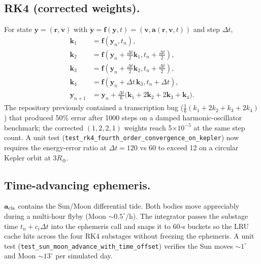 \documentclass[11pt]{amsart}
\begin{document}
\subsection{RK4 (corrected weights).}
For state $\mathbf y=(\mathbf r,\mathbf v)$ with $\dot{\mathbf y}=\mathbf f(\mathbf y,t)
=(\mathbf v,\mathbf a(\mathbf r,\mathbf v,t))$ and step $\Delta t$,
\begin{align*}
\mathbf k_1 &= \mathbf f(\mathbf y_n,t_n),\\
\mathbf k_2 &= \mathbf f(\mathbf y_n+\tfrac{\Delta t}{2}\mathbf k_1, t_n+\tfrac{\Delta t}{2}),\\
\mathbf k_3 &= \mathbf f(\mathbf y_n+\tfrac{\Delta t}{2}\mathbf k_2, t_n+\tfrac{\Delta t}{2}),\\
\mathbf k_4 &= \mathbf f(\mathbf y_n+\Delta t\,\mathbf k_3, t_n+\Delta t),\\
\mathbf y_{n+1} &= \mathbf y_n + \tfrac{\Delta t}{6}\bigl(\mathbf k_1+2\mathbf k_2
  +2\mathbf k_3+\mathbf k_4\bigr).
\end{align*}
The repository previously contained a transcription bug
($\tfrac{1}{6}(k_1+2k_2+k_3+2k_4)$) that produced 50\% error after 1000 steps on a damped
harmonic-oscillator benchmark; the corrected $(1,2,2,1)$ weights reach 5$\times 10^{-5}$ at
the same step count. A unit test (\texttt{test\_rk4\_fourth\_order\_convergence\_on\_kepler})
now requires the energy-error ratio at $\Delta t=120$ vs $60$ to exceed 12 on a circular
Kepler orbit at $3R_\oplus$.

\subsection{Time-advancing ephemeris.}
$\mathbf a_{\rm cls}$ contains the Sun/Moon differential tide. Both bodies move appreciably
during a multi-hour flyby (Moon $\sim 0.5^\circ$/h). The integrator passes the substage time
$t_n+c_i\Delta t$ into the ephemeris call and snaps it to 60-s buckets so the LRU cache hits
across the four RK4 substages without freezing the ephemeris. A unit test
(\texttt{test\_sun\_moon\_advance\_with\_time\_offset}) verifies the Sun moves $\sim 1^\circ$
and Moon $\sim 13^\circ$ per simulated day.
\end{document}
